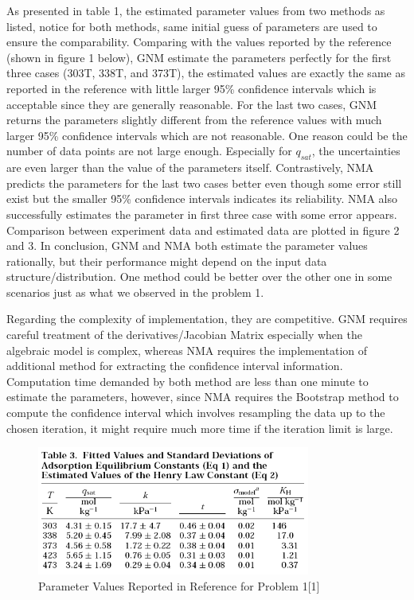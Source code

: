 \documentclass[12pt]{article} %
\begin{document}
As presented in table 1, the estimated parameter values from two methods as listed, notice for both methods, same initial guess of parameters are used to ensure the comparability. Comparing with the values reported by the reference (shown in figure 1 below), GNM estimate the parameters perfectly for the first three cases (303T, 338T, and 373T), the estimated values are
exactly the same as reported in the reference with little larger 95\% confidence intervals which is acceptable since they are generally reasonable. For the last two cases, GNM returns the parameters slightly different from 
the reference values with much larger 95\% confidence intervals which are not reasonable. One reason could be the number of data points are not large enough. Especially for $q_{sat}$, the uncertainties are even larger than the value of the parameters itself. Contrastively, NMA predicts the parameters for
the last two cases better even though some error still exist but the smaller 95\% confidence intervals indicates its reliability. NMA also successfully estimates the parameter in first three case with some error appears. Comparison between experiment data and estimated data are plotted in
figure 2 and 3. In conclusion, GNM and NMA both estimate the parameter values rationally, but their performance might depend on the input data structure/distribution. One method could be better over the other one in some scenarios just as what we observed in the problem 1. 

Regarding the complexity of
implementation, they are competitive. GNM requires careful treatment of the derivatives/Jacobian Matrix especially when the algebraic model is complex, whereas NMA requires the implementation of additional method for extracting the confidence interval information. Computation time demanded by both
method are less than one minute to estimate the parameters, however, since NMA requires the Bootstrap method to compute the confidence interval which involves resampling the data up to the chosen iteration, it might require much more time if the iteration limit is large.
\begin{figure}[ht]
    \centering
    \includegraphics[width=0.8\textwidth]{Q1_ref.png}
    \caption{Parameter Values Reported in Reference for Problem 1[1]}
\end{figure}
\end{document}
